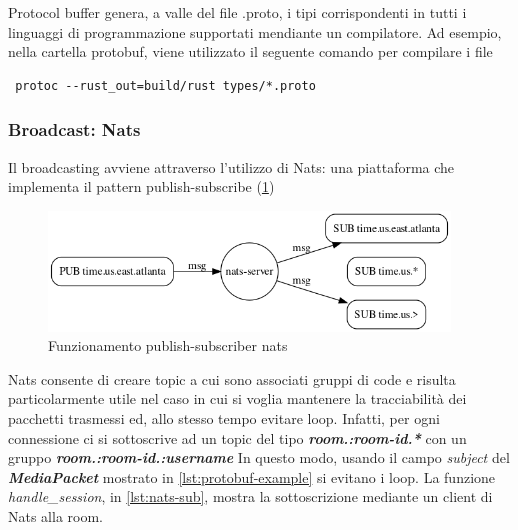 \documentclass{article}
\begin{document}


Protocol buffer genera, a valle del file .proto, i tipi corrispondenti in tutti i linguaggi 
di programmazione supportati mendiante un compilatore. Ad esempio, nella cartella protobuf,
viene utilizzato il seguente comando per compilare i file 
\begin{verbatim}
 protoc --rust_out=build/rust types/*.proto 
\end{verbatim}

\subsubsection{Broadcast: Nats} 
Il broadcasting avviene attraverso l'utilizzo di Nats\cite{Nats}: una piattaforma che implementa il
pattern publish-subscribe (\cref{fig:nats})
\begin{figure}
  \begin{center}
    \includegraphics[width=0.95\textwidth]{figures/nats.png}
  \end{center}
  \caption{Funzionamento publish-subscriber nats}\label{fig:nats}
\end{figure}
Nats consente di creare topic a cui sono associati gruppi di code e risulta particolarmente
utile nel caso in cui si voglia mantenere la tracciabilità dei pacchetti trasmessi ed, allo
stesso tempo evitare loop. Infatti, per ogni connessione ci si sottoscrive ad un topic 
del tipo \textbf{\textit{room.:room-id.*}} con un gruppo \textbf{\textit{room.:room-id.:username}}
In questo modo, usando il campo \textit{subject} del \textbf{\textit{MediaPacket}} mostrato 
in \cref{lst:protobuf-example} si evitano i loop. La funzione \textit{handle\_session},
in \cref{lst:nats-sub}, mostra la sottoscrizione mediante un client di Nats alla room. 
\end{document}
